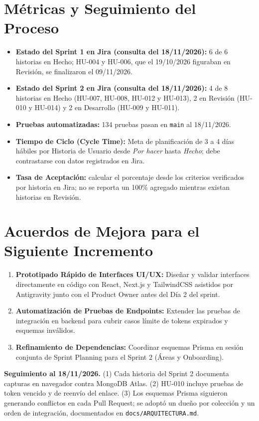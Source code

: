 \documentclass[11pt,a4paper]{article}
\begin{document}
\section{Métricas y Seguimiento del Proceso}
\begin{itemize}[leftmargin=*]
    \item \textbf{Estado del Sprint 1 en Jira (consulta del 18/11/2026):} 6 de 6 historias en Hecho; HU-004 y HU-006, que el 19/10/2026 figuraban en Revisión, se finalizaron el 09/11/2026.
    \item \textbf{Estado del Sprint 2 en Jira (consulta del 18/11/2026):} 4 de 8 historias en Hecho (HU-007, HU-008, HU-012 y HU-013), 2 en Revisión (HU-010 y HU-014) y 2 en Desarrollo (HU-009 y HU-011).
    \item \textbf{Pruebas automatizadas:} 134 pruebas pasan en \texttt{main} al 18/11/2026.
    \item \textbf{Tiempo de Ciclo (Cycle Time):} Meta de planificación de 3 a 4 días hábiles por Historia de Usuario desde \textit{Por hacer} hasta \textit{Hecho}; debe contrastarse con datos registrados en Jira.
    \item \textbf{Tasa de Aceptación:} calcular el porcentaje desde los criterios verificados por historia en Jira; no se reporta un 100\% agregado mientras existan historias en Revisión.
\end{itemize}

\section{Acuerdos de Mejora para el Siguiente Incremento}
\begin{enumerate}[leftmargin=*]
    \item \textbf{Prototipado Rápido de Interfaces UI/UX:} Diseñar y validar interfaces directamente en código con React, Next.js y TailwindCSS asistidos por Antigravity junto con el Product Owner antes del Día 2 del sprint.
    \item \textbf{Automatización de Pruebas de Endpoints:} Extender las pruebas de integración en backend para cubrir casos límite de tokens expirados y esquemas inválidos.
    \item \textbf{Refinamiento de Dependencias:} Coordinar esquemas Prisma en sesión conjunta de Sprint Planning para el Sprint 2 (Áreas y Onboarding).
\end{enumerate}

\textbf{Seguimiento al 18/11/2026.} (1) Cada historia del Sprint 2 documenta capturas en navegador contra MongoDB Atlas. (2) HU-010 incluye pruebas de token vencido y de reenvío del enlace. (3) Los esquemas Prisma siguieron generando conflictos en cada Pull Request; se adoptó un dueño por colección y un orden de integración, documentados en \texttt{docs/ARQUITECTURA.md}.
\end{document}
